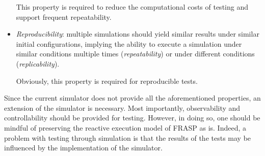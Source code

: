 \begin{itemize}
        This property is required to reduce the computational costs of testing
        and support frequent repeatability.
  \item \textit{Reproducibility}: multiple simulations should yield similar
        results under similar initial configurations, implying the ability to
        execute a simulation under similar conditions multiple times
        (\textit{repeatability}) or under different conditions
        (\textit{replicability}).

        Obviously, this property is required for reproducible tests.
\end{itemize}

Since the current simulator does not provide all the aforementioned properties,
an extension of the simulator is necessary. Most importantly, observability and
controllability should be provided for testing. However, in doing so, one
should be mindful of preserving the reactive execution model of FRASP as is.
Indeed, a problem with testing through simulation is that the results of the
tests may be influenced by the implementation of the simulator.

